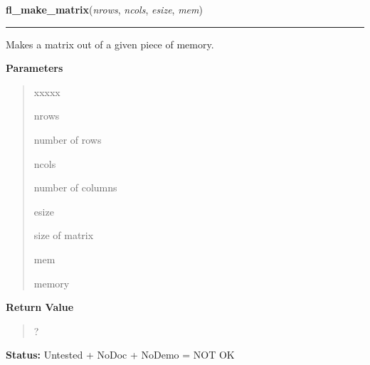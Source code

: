     \vspace{0.5ex}

\hspace{.8\funcindent}\begin{boxedminipage}{\funcwidth}

    \raggedright \textbf{fl\_make\_matrix}(\textit{nrows}, \textit{ncols}, \textit{esize}, \textit{mem})

    \vspace{-1.5ex}

    \rule{\textwidth}{0.5\fboxrule}
\setlength{\parskip}{2ex}
    Makes a matrix out of a given piece of memory.

\setlength{\parskip}{1ex}
      \textbf{Parameters}
      \vspace{-1ex}

      \begin{quote}
        \begin{Ventry}{xxxxx}

          \item[nrows]

          number of rows

          \item[ncols]

          number of columns

          \item[esize]

          size of matrix

          \item[mem]

          memory

        \end{Ventry}

      \end{quote}

      \textbf{Return Value}
    \vspace{-1ex}

      \begin{quote}
      ?

      \end{quote}

\textbf{Status:} Untested + NoDoc + NoDemo = NOT OK



    \end{boxedminipage}

    \label{xformslib:library:fl_free_matrix}

